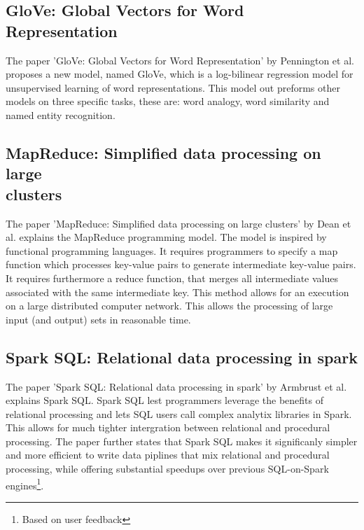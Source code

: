 \documentclass[10pt,a4paper]{article}
\begin{document}
\subsection{GloVe: Global Vectors for Word Representation}
The paper 'GloVe: Global Vectors for Word Representation' by Pennington et al.\cite{pennington2014glove} proposes a new model, named GloVe, which is a log-bilinear regression model for unsupervised learning of word representations. This model out preforms other models on three specific tasks, these are: word analogy, word similarity and named entity recognition.
\subsection{MapReduce: Simplified data processing on large \\clusters}
The paper 'MapReduce: Simplified data processing on large clusters' by Dean et al.\cite{dean2008mapreduce} explains the MapReduce programming model. The model is inspired by functional programming languages. It requires programmers to specify a map function which processes key-value pairs to generate intermediate key-value pairs. It requires furthermore a reduce function, that merges all intermediate values associated with the same intermediate key. This method allows for an execution on a large distributed computer network. This allows the processing of large input (and output) sets in reasonable time.
\subsection{Spark SQL: Relational data processing in spark}
The paper 'Spark SQL: Relational data processing in spark' by Armbrust et al.\cite{armbrust2015spark} explains Spark SQL. Spark SQL lest programmers leverage the benefits of relational processing and lets SQL users call complex analytix libraries in Spark. This allows for much tighter intergration between relational and procedural processing. The paper further states that Spark SQL makes it significanly simpler and more efficient to write data piplines that mix relational and procedural processing, while offering substantial speedups over previous SQL-on-Spark engines\footnote{Based on user feedback}.

\newpage


\end{document}
